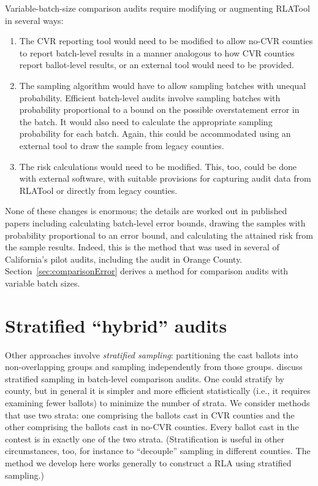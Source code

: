 \documentclass[runningheads]{llncs}
\begin{document}
Variable-batch-size comparison audits require modifying or augmenting
RLATool in several ways: 
\begin{enumerate}

  \item The CVR reporting tool would need to be modified to allow no-CVR counties to
report batch-level results in a manner analogous to how CVR counties report
ballot-level results, or an external tool would need to be provided.

  \item The sampling
algorithm would have to allow sampling batches with unequal probability.
Efficient batch-level audits involve sampling batches with probability proportional
to a bound on the possible overstatement error in the batch.
It would also need to calculate the appropriate sampling probability for each batch.
Again, this could be accommodated using an external tool to draw the sample from legacy counties.

  \item The risk calculations would need to be modified. 
This, too, could be done with external software, with suitable provisions for capturing audit data
from RLATool or directly from legacy counties.
\end{enumerate}

None of these changes is enormous; the details are worked out
in published papers \cite{stark09c,stark09b,stark10d} including calculating
batch-level error bounds, drawing the samples with probability proportional to an
error bound, and calculating the attained risk from the sample results.
Indeed, this is the method that was used in several of California's pilot audits,
including the audit in Orange County.
Section~\ref{sec:comparisonError} derives a method for comparison audits with variable batch sizes.

\section{Stratified ``hybrid'' audits} \label{sec:hybrid}

Other approaches involve \emph{stratified sampling}: partitioning the cast ballots
into non-overlapping groups and sampling independently from those groups.
\cite{stark08a,higginsEtal11} discuss stratified sampling in batch-level comparison audits.
One could stratify by county, but in general it is simpler and more efficient
statistically (i.e., it requires examining fewer ballots) to minimize the number of strata.
We consider methods that use two strata: one comprising the ballots cast in CVR counties and the other comprising the ballots cast in
no-CVR counties. 
Every ballot cast in the contest is in 
exactly one of the two strata. 
(Stratification is useful in other circumstances, too, for instance to ``decouple'' sampling
in different counties.
The method we develop here works generally to construct a RLA using stratified sampling.)
\end{document}
